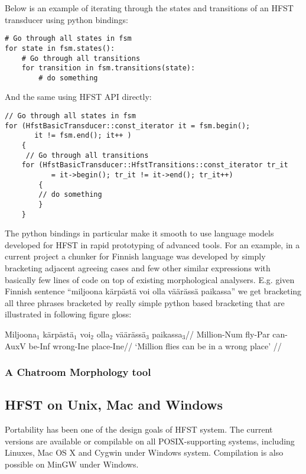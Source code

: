 \documentclass{llncs}
\begin{document}
Below is an example of iterating through the states and transitions of
an HFST transducer using python bindings:

\begin{verbatim}
# Go through all states in fsm       
for state in fsm.states():
    # Go through all transitions                                               
    for transition in fsm.transitions(state):
        # do something
\end{verbatim}

And the same using HFST API directly:

\begin{verbatim}
// Go through all states in fsm
for (HfstBasicTransducer::const_iterator it = fsm.begin();
       it != fsm.end(); it++ )      
    {      
     // Go through all transitions    
    for (HfstBasicTransducer::HfstTransitions::const_iterator tr_it  
           = it->begin(); tr_it != it->end(); tr_it++) 
        {
        // do something
        }
    }
\end{verbatim}

The python bindings in particular make it smooth to use language
models developed for HFST in rapid prototyping of advanced tools. For
an example, in a current project a chunker for Finnish language was
developed by simply bracketing adjacent agreeing cases and few other
similar expressions with basically few lines of code on top of
existing morphological analysers. E.g.  given Finnish sentence
``miljoona kärpästä voi olla väärässä paikassa'' we get bracketing all
three phrases bracketed by really simple python based bracketing that
are illustrated in following figure gloss:

\ex
\begingl
\gla Miljoona$_1$ kärpästä$_1$ voi$_2$ olla$_2$ väärässä$_3$ paikassa$_3$//
\glb Million-{\sc Num} fly-{\sc Par} can-{\sc AuxV} be-{\sc Inf} wrong-{\sc Ine} place-{\sc Ine}//
\glft `Million flies can be in a wrong place' //
\endgl
\xe


\subsubsection{A Chatroom Morphology tool}

\subsection{HFST on Unix, Mac and Windows}

Portability has been one of the design goals of HFST system. The
current versions are available or compilable on all POSIX-supporting
systems, including Linuxes, Mac OS X and Cygwin under Windows
system. Compilation is also possible on MinGW under Windows.
\end{document}
